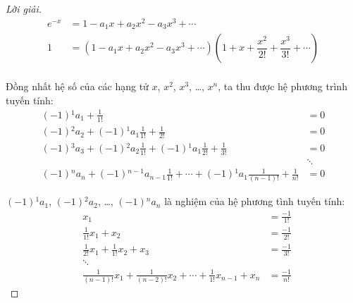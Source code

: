 \documentclass[class=linearalgebra,crop=false]{standalone}
\begin{document}
\begin{proof}[Lời giải]
    \begingroup
    \allowdisplaybreaks
    \begin{align*}
        e^{-x} & = 1 - a_{1}x + a_{2}x^{2} - a_{3}x^{3} + \cdots                                                                      \\
        1      & = (1 - a_{1}x + a_{2}x^{2} - a_{3}x^{3} + \cdots)\left(1 + x + \dfrac{x^{2}}{2!} + \dfrac{x^{3}}{3!} + \cdots\right) \\
    \end{align*}
    \endgroup
    \par Đồng nhất hệ số của các hạng tử $x$, $x^{2}$, $x^{3}$, \ldots, $x^{n}$, ta thu được hệ phương trình tuyến tính:
    \begin{align*}
        (-1){}^{1}a_{1} + \frac{1}{1!}                                                                              & = 0    \\
        (-1){}^{2}a_{2} + (-1){}^{1}a_{1}\frac{1}{1!} + \frac{1}{2!}                                                & = 0    \\
        (-1){}^{3}a_{3} + (-1){}^{2}a_{2}\frac{1}{1!} + (-1){}^{1}a_{1}\frac{1}{2!} + \frac{1}{3!}                  & = 0    \\
                                                                                                                    & \ddots \\
        (-1){}^{n}a_{n} + (-1){}^{n-1}a_{n-1}\frac{1}{1!} + \cdots + (-1){}^{1}a_{1}\frac{1}{(n-1)!} + \frac{1}{n!} & = 0
    \end{align*}
    \par $(-1){}^{1}a_{1}$, $(-1){}^{2}a_{2}$, \ldots, $(-1){}^{n}a_{n}$ là nghiệm của hệ phương tình tuyến tính:
    \begin{align*}
         & x_{1}                                                                                & = \frac{-1}{1!} \\
         & \frac{1}{1!}x_{1} + x_{2}                                                            & = \frac{-1}{2!} \\
         & \frac{1}{2!}x_{1} + \frac{1}{1!}x_{2} + x_{3}                                        & = \frac{-1}{3!} \\
         & \ddots                                                                               &                 \\
         & \frac{1}{(n-1)!}x_{1} + \frac{1}{(n-2)!}x_{2} + \cdots + \frac{1}{1!}x_{n-1} + x_{n} & = \frac{-1}{n!}

\end{align*}
\end{proof}
\end{document}
